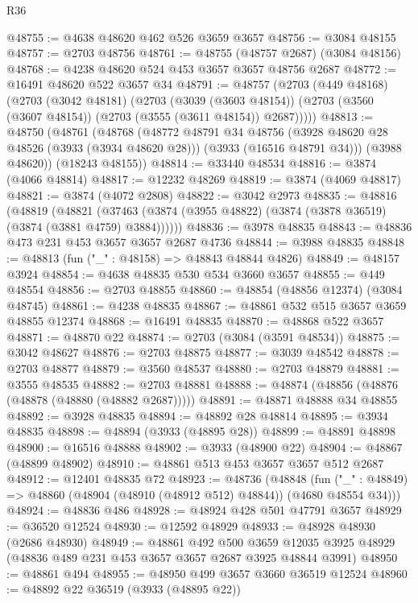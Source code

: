 \begin{lexlean}{R36}
\begin{coremodule}
@48755 := @4638 @48620 @462 @526 @3659 @3657
@48756 := @3084 @48155
@48757 := @2703 @48756
@48761 := @48755 (@48757 @2687) (@3084 @48156)
@48768 := @4238 @48620 @524 @453 @3657 @3657 @48756 @2687
@48772 := @16491 @48620 @522 @3657 @34
@48791 := @48757
    (@2703
      (@449 @48168)
      (@2703
        (@3042 @48181)
        (@2703
          (@3039 (@3603 @48154))
          (@2703 (@3560 (@3607 @48154)) (@2703 (@3555 (@3611 @48154)) @2687)))))
@48813 := @48750
    (@48761
      (@48768
        (@48772
          @48791
          @34
          @48756
          (@3928 @48620 @28 @48526 (@3933 (@3934 @48620 @28)))
          (@3933 (@16516 @48791 @34)))
        (@3988 @48620))
      (@18243 @48155))
@48814 := @33440 @48534
@48816 := @3874 (@4066 @48814)
@48817 := @12232 @48269
@48819 := @3874 (@4069 @48817)
@48821 := @3874 (@4072 @2808)
@48822 := @3042 @2973
@48835 := @48816
    (@48819
      (@48821 (@37463 (@3874 (@3955 @48822) (@3874 (@3878 @36519) (@3874 (@3881 @4759) @3884))))))
@48836 := @3978 @48835
@48843 := @48836 @473 @231 @453 @3657 @3657 @2687 @4736
@48844 := @3988 @48835
@48848 := @48813 (fun ("_" : @48158) => @48843 @48844 @4826)
@48849 := @48157 @3924
@48854 := @4638 @48835 @530 @534 @3660 @3657
@48855 := @449 @48554
@48856 := @2703 @48855
@48860 := @48854 (@48856 @12374) (@3084 @48745)
@48861 := @4238 @48835
@48867 := @48861 @532 @515 @3657 @3659 @48855 @12374
@48868 := @16491 @48835
@48870 := @48868 @522 @3657
@48871 := @48870 @22
@48874 := @2703 (@3084 (@3591 @48534))
@48875 := @3042 @48627
@48876 := @2703 @48875
@48877 := @3039 @48542
@48878 := @2703 @48877
@48879 := @3560 @48537
@48880 := @2703 @48879
@48881 := @3555 @48535
@48882 := @2703 @48881
@48888 := @48874 (@48856 (@48876 (@48878 (@48880 (@48882 @2687)))))
@48891 := @48871 @48888 @34 @48855
@48892 := @3928 @48835
@48894 := @48892 @28 @48814
@48895 := @3934 @48835
@48898 := @48894 (@3933 (@48895 @28))
@48899 := @48891 @48898
@48900 := @16516 @48888
@48902 := @3933 (@48900 @22)
@48904 := @48867 (@48899 @48902)
@48910 := @48861 @513 @453 @3657 @3657 @512 @2687
@48912 := @12401 @48835 @72
@48923 := @48736
    (@48848
      (fun ("_" : @48849) => @48860 (@48904 (@48910 (@48912 @512) @48844)) (@4680 @48554 @34)))
@48924 := @48836 @486
@48928 := @48924 @428 @501 @47791 @3657
@48929 := @36520 @12524
@48930 := @12592 @48929
@48933 := @48928 @48930 (@2686 @48930)
@48949 := @48861
    @492
    @500
    @3659
    @12035
    @3925
    @48929
    (@48836 @489 @231 @453 @3657 @3657 @2687 @3925 @48844 @3991)
@48950 := @48861 @494
@48955 := @48950 @499 @3657 @3660 @36519 @12524
@48960 := @48892 @22 @36519 (@3933 (@48895 @22))

\end{coremodule}
\end{lexlean}
